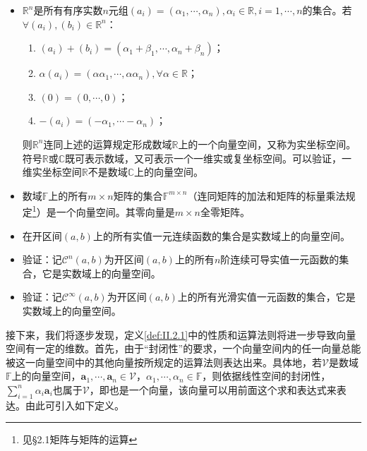 \documentclass[main.tex]{subfiles}
\begin{document}
\begin{example}\label{exp:II.2.1}
\quad
\begin{itemize}
    \item $\mathbb{R}^n$是所有有序实数$n$元组$\left(a_i\right)=\left(\alpha_1,\cdots,\alpha_n\right),\alpha_i\in\mathbb{R},i=1,\cdots,n$的集合。若$\forall \left(a_i\right),\left(b_i\right)\in\mathbb{R}^n$：
    \begin{enumerate}
        \item $\left(a_i\right)+\left(b_i\right)=\left(\alpha_1+\beta_1,\cdots,\alpha_n+\beta_n\right)$；
        \item $\alpha\left(a_i\right)=\left(\alpha\alpha_1,\cdots,\alpha\alpha_n\right),\forall\alpha\in\mathbb{R}$；
        \item $\left(0\right)=\left(0,\cdots,0\right)$；
        \item $-\left(a_i\right)=\left(-\alpha_1,\cdots-\alpha_n\right)$；
    \end{enumerate}
    则$\mathbb{R}^n$连同上述的运算规定形成数域$\mathbb{R}$上的一个向量空间，又称为实坐标空间。符号$\mathbb{R}$或$\mathbb{C}$既可表示数域，又可表示一个一维实或复坐标空间。可以验证，一维实坐标空间$\mathbb{R}$不是数域$\mathbb{C}$上的向量空间。
    \item 数域$\mathbb{F}$上的所有$m\times n$矩阵的集合$\mathbb{F}^{m\times n}$（连同矩阵的加法和矩阵的标量乘法规定\footnote{见\cite{周胜林2012线性代数}\S 2.1矩阵与矩阵的运算}）是一个向量空间。其零向量是$m\times n$全零矩阵。
    \item 在开区间$\left(a,b\right)$上的所有实值一元连续函数的集合是实数域上的向量空间。
    \item 验证：记$\mathcal{C}^n\left(a,b\right)$为开区间$\left(a,b\right)$上的所有$n$阶连续可导实值一元函数的集合，它是实数域上的向量空间。
    \item 验证：记$\mathcal{C}^\infty\left(a,b\right)$为开区间$\left(a,b\right)$上的所有光滑实值一元函数的集合，它是实数域上的向量空间。
\end{itemize}
\end{example}

接下来，我们将逐步发现，定义\ref{def:II.2.1}中的性质和运算法则将进一步导致向量空间有一定的维数。首先，由于“封闭性”的要求，一个向量空间内的任一向量总能被这一向量空间中的其他向量按所规定的运算法则表达出来。具体地，若$\mathcal{V}$是数域$\mathbb{F}$上的向量空间，$\mathbf{a}_1,\cdots,\mathbf{a}_n\in\mathcal{V}$，$\alpha_1,\cdots,\alpha_n\in\mathbb{F}$，则依据线性空间的封闭性，$\sum_{i=1}^n\alpha_i\mathbf{a}_i$也属于$\mathcal{V}$，即也是一个向量，该向量可以用前面这个求和表达式来表达。由此可引入如下定义。
\end{document}
